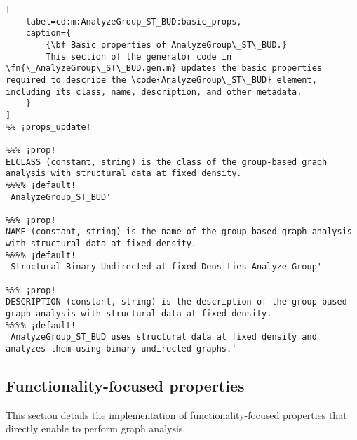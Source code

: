 \documentclass{tufte-handout}
\begin{document}
\begin{lstlisting}[
	label=cd:m:AnalyzeGroup_ST_BUD:basic_props,
	caption={
		{\bf Basic properties of AnalyzeGroup\_ST\_BUD.}
		This section of the generator code in \fn{\_AnalyzeGroup\_ST\_BUD.gen.m} updates the basic properties required to describe the \code{AnalyzeGroup\_ST\_BUD} element, including its class, name, description, and other metadata.
	}
]
%% ¡props_update!

%%% ¡prop!
ELCLASS (constant, string) is the class of the group-based graph analysis with structural data at fixed density.
%%%% ¡default!
'AnalyzeGroup_ST_BUD'

%%% ¡prop!
NAME (constant, string) is the name of the group-based graph analysis with structural data at fixed density.
%%%% ¡default!
'Structural Binary Undirected at fixed Densities Analyze Group'

%%% ¡prop!
DESCRIPTION (constant, string) is the description of the group-based graph analysis with structural data at fixed density.
%%%% ¡default!
'AnalyzeGroup_ST_BUD uses structural data at fixed density and analyzes them using binary undirected graphs.'

\end{lstlisting}

\subsection{Functionality-focused properties}

This section details the implementation of functionality-focused properties that directly enable  to perform graph analysis.
\end{document}

